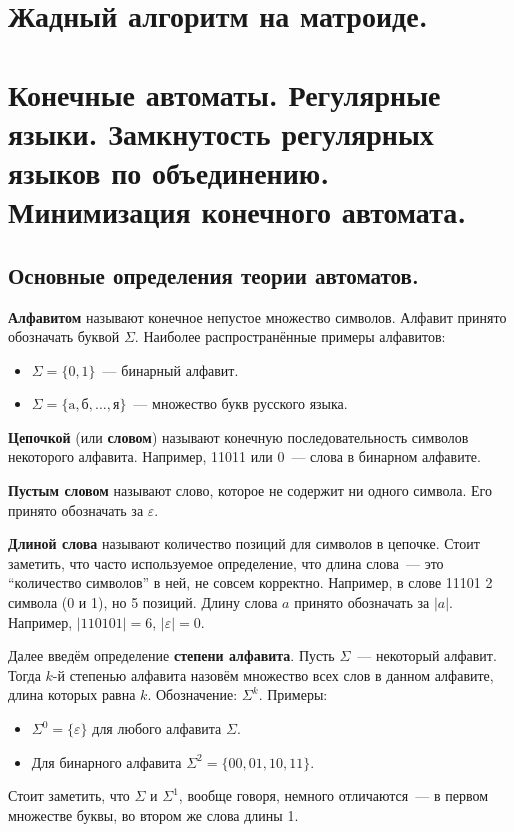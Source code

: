 \documentclass[a4paper,12pt]{article}
\begin{document}
\newpage
\section{Жадный алгоритм на матроиде.}


\newpage
\section{Конечные автоматы. Регулярные языки. Замкнутость регулярных языков по объединению. Минимизация конечного автомата.}
	 \subsection{Основные определения теории автоматов.}
	\textbf{Алфавитом} называют конечное непустое множество символов. Алфавит принято обозначать буквой \(\Sigma\). Наиболее распространённые примеры алфавитов:
	\begin{itemize}
		\item \(\Sigma = \{0, 1\}\)~--- бинарный алфавит.
		\item \(\Sigma = \{\text{a}, \text{б}, \ldots, \text{я}\}\)~--- множество букв русского языка.
	\end{itemize}
	
	\textbf{Цепочкой} (или \textbf{словом}) называют конечную последовательность символов некоторого алфавита. Например, 11011 или 0~--- слова в бинарном алфавите.
	
	\textbf{Пустым словом} называют слово, которое не содержит ни одного символа. Его принято обозначать за \(\varepsilon\).
	
	\textbf{Длиной слова} называют количество позиций для символов в цепочке. Стоит заметить, что часто используемое определение, что длина слова~--- это ``количество символов'' в ней, не совсем корректно. Например, в слове 11101 2 символа (0 и 1), но 5 позиций. Длину слова \(a\) принято обозначать за \(|a|\). Например, \(|110101| = 6\), \(|\varepsilon| = 0\).
	
	Далее введём определение \textbf{степени алфавита}. Пусть \(\Sigma\)~--- некоторый алфавит. Тогда \(k\)-й степенью алфавита назовём множество всех слов в данном алфавите, длина которых равна \(k\). Обозначение: \(\Sigma^k\).
	Примеры:
	\begin{itemize}
		\item \(\Sigma^0 = \{\varepsilon\}\) для любого алфавита \(\Sigma\).
		\item Для бинарного алфавита \(\Sigma^2 = \{00, 01, 10, 11\}\).
	\end{itemize}
	Стоит заметить, что \(\Sigma\) и \(\Sigma^1\), вообще говоря, немного отличаются~--- в первом множестве буквы, во втором же слова длины 1.
	
\end{document}
